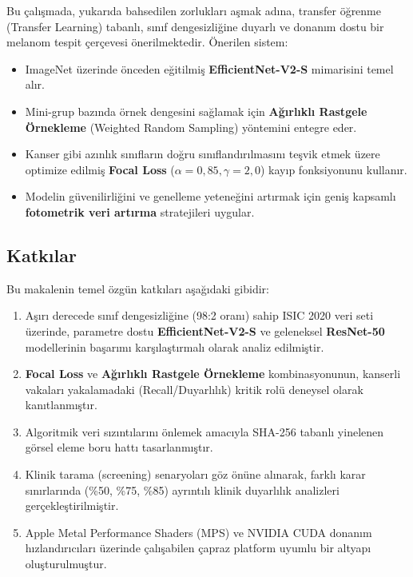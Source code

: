 \documentclass[12pt,a4paper]{article}
\begin{document}
Bu çalışmada, yukarıda bahsedilen zorlukları aşmak adına, transfer öğrenme (Transfer Learning) tabanlı, sınıf dengesizliğine duyarlı ve donanım dostu bir melanom tespit çerçevesi önerilmektedir. Önerilen sistem:
\begin{itemize}
    \item ImageNet üzerinde önceden eğitilmiş \textbf{EfficientNet-V2-S} mimarisini temel alır.
    \item Mini-grup bazında örnek dengesini sağlamak için \textbf{Ağırlıklı Rastgele Örnekleme} (Weighted Random Sampling) yöntemini entegre eder.
    \item Kanser gibi azınlık sınıfların doğru sınıflandırılmasını teşvik etmek üzere optimize edilmiş \textbf{Focal Loss} ($\alpha=0,85, \gamma=2,0$) kayıp fonksiyonunu kullanır.
    \item Modelin güvenilirliğini ve genelleme yeteneğini artırmak için geniş kapsamlı \textbf{fotometrik veri artırma} stratejileri uygular.
\end{itemize}

\subsection{Katkılar}
\label{subsec:katkilar}

Bu makalenin temel özgün katkıları aşağıdaki gibidir:
\begin{enumerate}
    \item Aşırı derecede sınıf dengesizliğine (98:2 oranı) sahip ISIC 2020 veri seti üzerinde, parametre dostu \textbf{EfficientNet-V2-S} ve geleneksel \textbf{ResNet-50} modellerinin başarımı karşılaştırmalı olarak analiz edilmiştir.
    \item \textbf{Focal Loss} ve \textbf{Ağırlıklı Rastgele Örnekleme} kombinasyonunun, kanserli vakaları yakalamadaki (Recall/Duyarlılık) kritik rolü deneysel olarak kanıtlanmıştır.
    \item Algoritmik veri sızıntılarını önlemek amacıyla SHA-256 tabanlı yinelenen görsel eleme boru hattı tasarlanmıştır.
    \item Klinik tarama (screening) senaryoları göz önüne alınarak, farklı karar sınırlarında (\%50, \%75, \%85) ayrıntılı klinik duyarlılık analizleri gerçekleştirilmiştir.
    \item Apple Metal Performance Shaders (MPS) ve NVIDIA CUDA donanım hızlandırıcıları üzerinde çalışabilen çapraz platform uyumlu bir altyapı oluşturulmuştur.
\end{enumerate}
\end{document}
